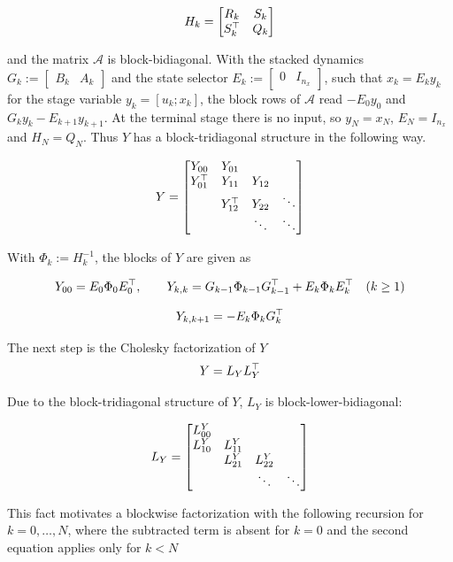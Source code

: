 \[
H_k = \begin{bmatrix} R_k & S_k \\ S_k^\top & Q_k \end{bmatrix}
\]

and the matrix $\mathcal{A}$ is block-bidiagonal.
With the stacked dynamics $G_k := \begin{bmatrix} B_k & A_k \end{bmatrix}$ and the state selector $E_k := \begin{bmatrix} 0 & I_{n_x} \end{bmatrix}$, such that $x_k = E_k y_k$ for the stage variable $y_k = [u_k; x_k]$, the block rows of $\mathcal{A}$ read $-E_0 y_0$ and $G_k y_k - E_{k+1} y_{k+1}$.
At the terminal stage there is no input, so $y_N = x_N$, $E_N = I_{n_x}$ and $H_N = Q_N$.
Thus $Y$ has a block-tridiagonal structure in the following way.

\[
Y = 
\begin{bmatrix}
    Y_{00}   & Y_{01}    &        &        \\
    Y_{01}^\top & Y_{11}    & Y_{12} &        \\
             & Y_{12}^\top  & Y_{22} & \ddots \\
             &           & \ddots & \ddots
\end{bmatrix}
\]

With $\Phi_k := H_k^{-1}$, the blocks of $Y$ are given as

\[
Y_{00} = E_0 \Phi_0 E_0^\top, \qquad
Y_{k,k} = G_{k-1} \Phi_{k-1} G_{k-1}^\top + E_k \Phi_k E_k^\top \quad (k \geq 1)
\]

\[
Y_{k,k+1} = -E_k \Phi_k G_k^\top
\]

The next step is the Cholesky factorization of $Y$
\[
Y = L_Y L_Y^\top
\]

Due to the block-tridiagonal structure of $Y$, $L_Y$ is block-lower-bidiagonal:

\[
L_Y =
\begin{bmatrix}
    {L^{Y}_{00}} &         &         & \\
    {L^{Y}_{10}} & {L^{Y}_{11}} &         & \\
            & {L^{Y}_{21}} & {L^{Y}_{22}} & \\
           &        & \ddots & \ddots
\end{bmatrix}
\]

This fact motivates a blockwise factorization with the following recursion for $k = 0, \dots, N$, where the subtracted term is absent for $k = 0$ and the second equation applies only for $k < N$

